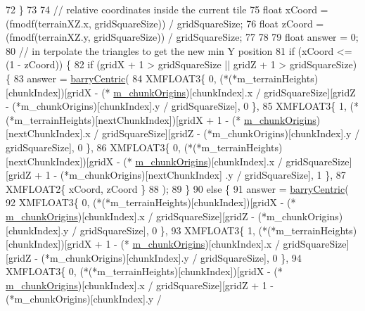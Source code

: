 \begin{DoxyCode}
72     \}
73 
74     \textcolor{comment}{// relative coordinates inside the current tile}
75     \textcolor{keywordtype}{float} xCoord = (fmodf(terrainXZ.x, gridSquareSize)) / gridSquareSize;
76     \textcolor{keywordtype}{float} zCoord = (fmodf(terrainXZ.y, gridSquareSize)) / gridSquareSize;
77 
78 
79     \textcolor{keywordtype}{float} answer = 0;
80     \textcolor{comment}{// in terpolate the triangles to get the new min Y position}
81     \textcolor{keywordflow}{if} (xCoord <= (1 - zCoord)) \{
82         \textcolor{keywordflow}{if} (gridX + 1 > gridSquareSize || gridZ + 1 > gridSquareSize) \{
83             answer = \mbox{\hyperlink{class_terrain_collision_helper_aacd402e6c1598bda975a51883bbd409a}{barryCentric}}(
84                 XMFLOAT3\{ 0, (*(*m\_terrainHeights)[chunkIndex])[gridX - (*
      \mbox{\hyperlink{class_terrain_collision_helper_a49449b3d4ccf601ddca4200b5aa39b85}{m\_chunkOrigins}})[chunkIndex].x / gridSquareSize][gridZ - (*m\_chunkOrigins)[chunkIndex].y / 
      gridSquareSize], 0 \},
85                 XMFLOAT3\{ 1, (*(*m\_terrainHeights)[nextChunkIndex])[gridX + 1 - (*
      \mbox{\hyperlink{class_terrain_collision_helper_a49449b3d4ccf601ddca4200b5aa39b85}{m\_chunkOrigins}})[nextChunkIndex].x / gridSquareSize][gridZ - (*m\_chunkOrigins)[chunkIndex].y /
       gridSquareSize], 0 \},
86                 XMFLOAT3\{ 0, (*(*m\_terrainHeights)[nextChunkIndex])[gridX - (*
      \mbox{\hyperlink{class_terrain_collision_helper_a49449b3d4ccf601ddca4200b5aa39b85}{m\_chunkOrigins}})[chunkIndex].x / gridSquareSize][gridZ + 1 - (*m\_chunkOrigins)[nextChunkIndex]
      .y / gridSquareSize], 1 \},
87                 XMFLOAT2\{ xCoord, zCoord \}
88             );
89         \}
90         \textcolor{keywordflow}{else} \{
91             answer = \mbox{\hyperlink{class_terrain_collision_helper_aacd402e6c1598bda975a51883bbd409a}{barryCentric}}(
92                 XMFLOAT3\{ 0, (*(*m\_terrainHeights)[chunkIndex])[gridX - (*
      \mbox{\hyperlink{class_terrain_collision_helper_a49449b3d4ccf601ddca4200b5aa39b85}{m\_chunkOrigins}})[chunkIndex].x / gridSquareSize][gridZ - (*m\_chunkOrigins)[chunkIndex].y / 
      gridSquareSize], 0 \},
93                 XMFLOAT3\{ 1, (*(*m\_terrainHeights)[chunkIndex])[gridX + 1 - (*
      \mbox{\hyperlink{class_terrain_collision_helper_a49449b3d4ccf601ddca4200b5aa39b85}{m\_chunkOrigins}})[chunkIndex].x / gridSquareSize][gridZ - (*m\_chunkOrigins)[chunkIndex].y / 
      gridSquareSize], 0 \},
94                 XMFLOAT3\{ 0, (*(*m\_terrainHeights)[chunkIndex])[gridX - (*
      \mbox{\hyperlink{class_terrain_collision_helper_a49449b3d4ccf601ddca4200b5aa39b85}{m\_chunkOrigins}})[chunkIndex].x / gridSquareSize][gridZ + 1 - (*m\_chunkOrigins)[chunkIndex].y /

\end{DoxyCode}
